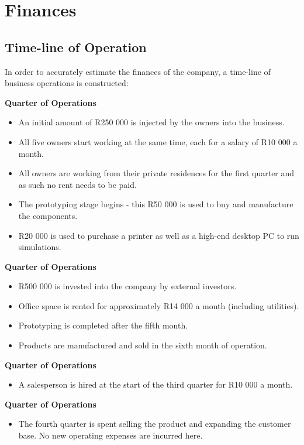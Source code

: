 \newpage

\chapter{Finances}

\section{Time-line of Operation}
In order to accurately estimate the finances of the company, a time-line of business operations is constructed:

{\bfseries {} Quarter of Operations}
\begin{itemize}
\item An initial amount of R250 000 is injected by the owners into the business.
\item All five owners start working at the same time, each for a salary of R10 000 a month.
\item All owners are working from their private residences for the first quarter and as such no rent needs to be paid.
\item The prototyping stage begins - this R50 000 is used to buy and manufacture the components.
\item R20 000 is used to purchase a printer as well as a high-end desktop PC to run simulations.
\end{itemize}

{\bfseries {} Quarter of Operations}
\begin{itemize}
\item R500 000 is invested into the company by external investors.
\item Office space is rented for approximately R14 000 a month (including utilities).
\item Prototyping is completed after the fifth month.
\item Products are manufactured and sold in the sixth month of operation.
\end{itemize}

{\bfseries {} Quarter of Operations}
\begin{itemize}
\item A salesperson is hired at the start of the third quarter for R10 000 a month.
\end{itemize}

{\bfseries {} Quarter of Operations}
\begin{itemize}
\item The fourth quarter is spent selling the product and expanding the customer base. No new operating expenses are incurred here.
\end{itemize}

